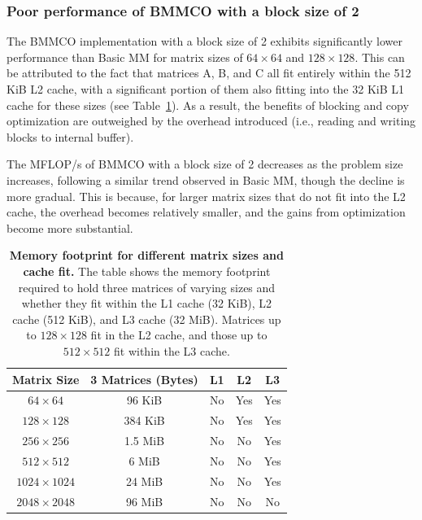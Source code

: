 \subsubsection{Poor performance of BMMCO with a block size of 2}
\label{subsubsec:poor-performance-bmmco-block-size-2}
The BMMCO implementation with a block size of 2 exhibits significantly lower performance than Basic MM for matrix sizes of \(64 \times 64\) and \(128 \times 128\). This can be attributed to the fact that matrices A, B, and C all fit entirely within the 512 KiB L2 cache, with a significant portion of them also fitting into the 32 KiB L1 cache for these sizes (see Table~\ref{tab:memory-footprint-three-matrices}). As a result, the benefits of blocking and copy optimization are outweighed by the overhead introduced (i.e., reading and writing blocks to internal buffer).

The MFLOP/s of BMMCO with a block size of 2 decreases as the problem size increases, following a similar trend observed in Basic MM, though the decline is more gradual. This is because, for larger matrix sizes that do not fit into the L2 cache, the overhead becomes relatively smaller, and the gains from optimization become more substantial.

\begin{table}[htbp]
    \centering\small
    \begin{tabular}{c|c|c|c|c}
        \textbf{Matrix Size} & \textbf{3 Matrices (Bytes)} & \textbf{L1} & \textbf{L2} & \textbf{L3} \\
        \hline
        \(64 \times 64\) & 96 KiB & No & Yes & Yes \\
        \(128 \times 128\) & 384 KiB & No & Yes & Yes \\
        \(256 \times 256\) & 1.5 MiB & No & No & Yes \\
        \(512 \times 512\) & 6 MiB & No & No & Yes \\
        \(1024 \times 1024\) & 24 MiB & No & No & Yes \\
        \(2048 \times 2048\) & 96 MiB & No & No & No \\
    \end{tabular}
    \caption{\textbf{Memory footprint for different matrix sizes and cache fit.} The table shows the memory footprint required to hold three matrices of varying sizes and whether they fit within the L1 cache (32 KiB), L2 cache (512 KiB), and L3 cache (32 MiB). Matrices up to \(128 \times 128\) fit in the L2 cache, and those up to \(512 \times 512\) fit within the L3 cache.}
    \label{tab:memory-footprint-three-matrices}
\end{table}

